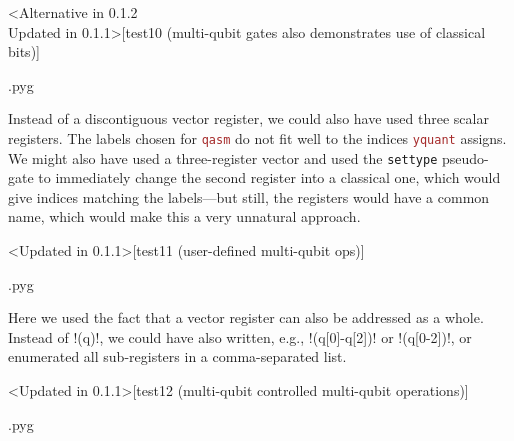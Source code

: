 \documentclass{scrartcl}
\makeatletter
\newenvironment{codeexample}{%
   \VerbatimEnvironment%
   \let\FVB@VerbatimOut\minted@FVB@VerbatimOut
   \let\FVE@VerbatimOut\minted@FVE@VerbatimOut
   \minted@configlang{tex}%
   \minted@fvset
   \begin{VerbatimOut}[codes={\catcode`\^^I=12},firstline,lastline]{\minted@jobname.pyg}%
}{
   \end{VerbatimOut}%
   \minted@langlinenoson%
   \savebox\codeexamplebox{ \minted@jobname.pyg}%
   \ifdim\wd\codeexamplebox>\dimexpr.5\linewidth-3mm\relax%
      \wd\codeexamplebox=.5\linewidth%
   \else%
      \wd\codeexamplebox=\dimexpr\wd\codeexamplebox+3mm\relax%
   \fi%
   \noindent\begin{minipage}{\wd\codeexamplebox}%
      \centering%
      \usebox\codeexamplebox%
   \end{minipage}%
   \begin{minipage}{\dimexpr\linewidth-\wd\codeexamplebox\relax}%
      \expandafter\minted@pygmentize\expandafter{\minted@lang}%
   \end{minipage}%
   \minted@langlinenosoff%
   \par%
}
\def\pkg#1{\textcolor{brown}{\texttt{#1}}}
\def\ttlink{\link\texttt}
\def\Yquant{\pkg{yquant}}
\makeatother
\begin{document}
         \begin{example}<Alternative in 0.1.2\\Updated in 0.1.1>[test10 (multi-qubit gates also demonstrates use of classical bits)]
            \begin{codeexample}
            \end{codeexample}
            Instead of a discontiguous vector register, we could also have used three scalar registers.
            The labels chosen for \pkg{qasm} do not fit well to the indices \Yquant{} assigns.
            We might also have used a three\hyp register vector and used the \ttlink{settype} pseudo\hyp gate to immediately change the second register into a classical one, which would give indices matching the labels---but still, the registers would have a common name, which would make this a very unnatural approach.
         \end{example}

         \clearpage
         \begin{example}<Updated in 0.1.1>[test11 (user-defined multi-qubit ops)]
            \begin{codeexample}
            \end{codeexample}
            Here we used the fact that a vector register can also be addressed as a whole.
            Instead of \tex!(q)!, we could have also written, e.g., \tex!(q[0]-q[2])! or \tex!(q[0-2])!, or enumerated all sub\hyp registers in a comma\hyp separated list.
         \end{example}

         \begin{example}<Updated in 0.1.1>[test12 (multi-qubit controlled multi-qubit operations)]
            \begin{codeexample}
            \end{codeexample}
         \end{example}
\end{document}
